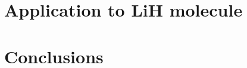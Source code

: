 \documentclass{article}
\begin{document}
\section{Application to LiH molecule}

\section{Conclusions}

\pagebreak
\end{document}
